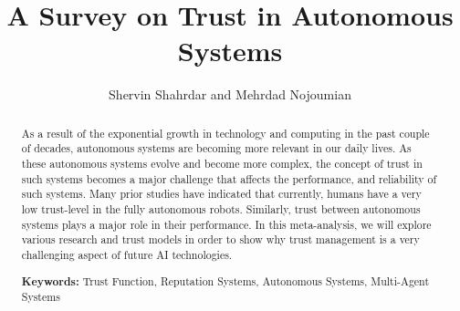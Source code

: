 \documentclass[runningheads,a4paper]{llncs}
\begin{document}

%
\frontmatter          %
%
\pagestyle{headings}  %
%
\mainmatter              %
%
\title{A Survey on Trust in Autonomous Systems \\ 
}
%
%
\author{\large Shervin Shahrdar and Mehrdad Nojoumian   %
}



\maketitle
\begin{abstract}

\noindent As a result of the exponential growth in technology and computing in the past couple of decades, autonomous systems are becoming more relevant in our daily lives. As these autonomous systems evolve and become more complex, the concept of trust in such systems becomes a major challenge that affects the performance, and reliability of such systems. Many prior studies have indicated that currently, humans have a very low trust-level in the fully autonomous robots. Similarly, trust between autonomous systems plays a major role in their performance. In this meta-analysis, we will explore various research and trust models in order to show why trust management is a very challenging aspect of future AI technologies.

\vspace{10pt}
\textbf{Keywords:} Trust Function, Reputation Systems, Autonomous Systems, Multi-Agent Systems
\end{abstract}
\end{document}
